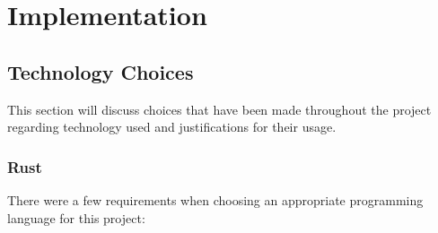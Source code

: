 \chapter{Implementation} \label{cha:chapter3}


\section{Technology Choices} \label{sec:chap3:technology}
This section will discuss choices that have been made throughout the project regarding technology used and justifications for their usage.

\subsection{Rust} \label{sec:chap3:technology:rust}
There were a few requirements when choosing an appropriate programming language for this project:
